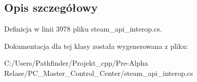 \subsection{Opis szczegółowy}


Definicja w linii 3978 pliku steam\+\_\+api\+\_\+interop.\+cs.



Dokumentacja dla tej klasy została wygenerowana z pliku\+:\begin{DoxyCompactItemize}
\item 
C\+:/\+Users/\+Pathfinder/\+Projekt\+\_\+cpp/\+Pre-\/\+Alpha Relase/\+P\+C\+\_\+\+Master\+\_\+\+Control\+\_\+\+Center/steam\+\_\+api\+\_\+interop.\+cs\end{DoxyCompactItemize}
